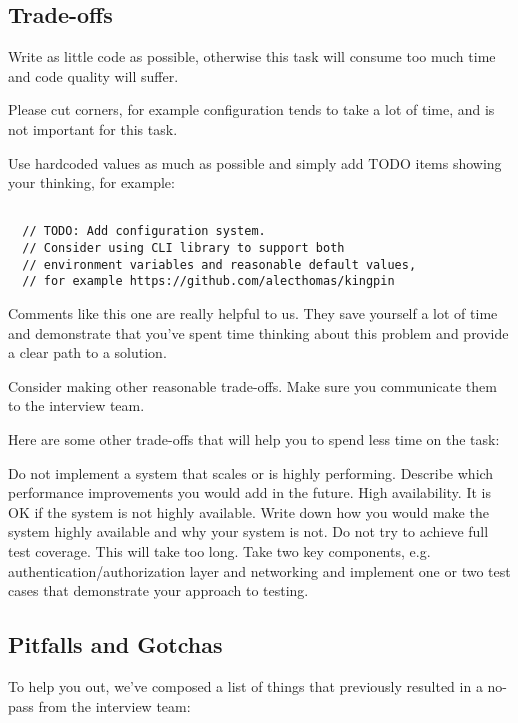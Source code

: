 \documentclass{article}
\begin{document}
\subsection{Trade-offs}

Write as little code as possible, otherwise this task will consume too much time and code quality will suffer.

Please cut corners, for example configuration tends to take a lot of time, and is not important for this task.

Use hardcoded values as much as possible and simply add TODO items showing your thinking, for example:

\begin{lstlisting}[caption=TODO example]

  // TODO: Add configuration system.
  // Consider using CLI library to support both
  // environment variables and reasonable default values,
  // for example https://github.com/alecthomas/kingpin

\end{lstlisting}

Comments like this one are really helpful to us.
They save yourself a lot of time and demonstrate that you've spent time thinking about this problem and provide a clear path to a solution.

Consider making other reasonable trade-offs. Make sure you communicate them to the interview team.

Here are some other trade-offs that will help you to spend less time on the task:


Do not implement a system that scales or is highly performing. Describe which performance improvements you would add in the future.
High availability. It is OK if the system is not highly available. Write down how you would make the system highly available and why your system is not.
Do not try to achieve full test coverage. This will take too long. Take two key components, e.g. authentication/authorization layer and networking and implement one or two test cases that demonstrate your approach to testing.


\subsection{Pitfalls and Gotchas}

  To help you out, we've composed a list of things that previously resulted in a no-pass from the interview team:
\end{document}
